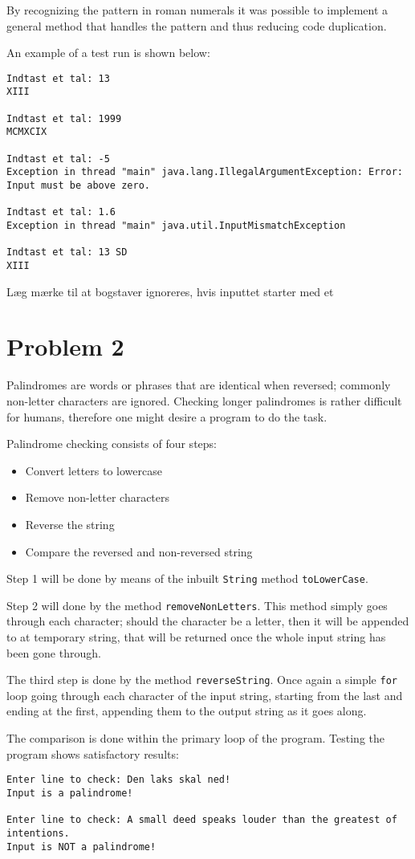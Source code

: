 \documentclass{scrartcl}
\newcommand\code[1]{\texttt{#1}}
\begin{document}
By recognizing the pattern in roman numerals it was possible to implement a general method that handles the pattern and thus reducing code duplication.

An example of a test run is shown below:

\begin{Verbatim}
Indtast et tal: 13
XIII

Indtast et tal: 1999
MCMXCIX

Indtast et tal: -5
Exception in thread "main" java.lang.IllegalArgumentException: Error: Input must be above zero.

Indtast et tal: 1.6
Exception in thread "main" java.util.InputMismatchException

Indtast et tal: 13 SD
XIII
\end{Verbatim}

Læg mærke til at bogstaver ignoreres, hvis inputtet starter med et

\section*{Problem 2}
Palindromes are words or phrases that are identical when reversed; commonly non-letter characters are ignored. Checking longer palindromes is rather difficult for humans, therefore one might desire a program to do the task.

Palindrome checking consists of four steps:
\begin{itemize}
\item Convert letters to lowercase
\item Remove non-letter characters
\item Reverse the string
\item Compare the reversed and non-reversed string
\end{itemize}
Step 1 will be done by means of the inbuilt \code{String} method \code{toLowerCase}.

Step 2 will done by the method \code{removeNonLetters}. This method simply goes through each character; should the character be a letter, then it will be appended to at temporary string, that will be returned once the whole input string has been gone through.

The third step is done by the method \code{reverseString}. Once again a simple \code{for} loop going through each character of the input string, starting from the last and ending at the first, appending them to the output string as it goes along.

The comparison is done within the primary loop of the program.
Testing the program shows satisfactory results:
\begin{Verbatim}
Enter line to check: Den laks skal ned!
Input is a palindrome!

Enter line to check: A small deed speaks louder than the greatest of intentions.
Input is NOT a palindrome!
\end{Verbatim}
\end{document}
